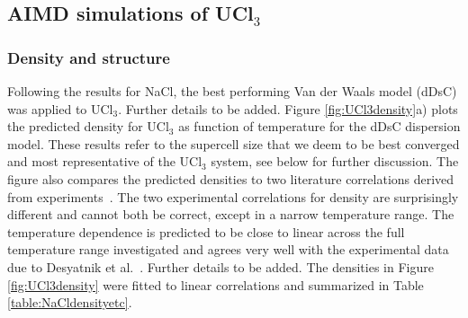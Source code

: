 \documentclass[preprint,3p,10pt,onecolumn,number,sort&compress]{elsarticle}
\begin{document}
\subsection{AIMD simulations of UCl$_3$}
\subsubsection{Density and structure}
Following the results for NaCl, the best performing Van der Waals model (dDsC) was applied to UCl$_3$. {\color{red} Further details to be added.}%
Figure \ref{fig:UCl3density}a) plots the predicted density for UCl$_3$ as function of temperature for the dDsC dispersion model. 
These results refer to the supercell size that we deem to be best converged and most representative of the UCl$_3$ system, see below for further discussion. 
The figure also compares the predicted densities to two literature correlations derived from experiments~\cite{Janz1988,Desyatnik}.
The two experimental correlations for density are surprisingly different and cannot both be correct, except in a narrow temperature range. 
 The temperature dependence is predicted to be close to linear across the full temperature range investigated and agrees very well with the experimental data due to Desyatnik et al.~\cite{Desyatnik}.  {\color{red}Further details to be added.} %
 The densities in Figure \ref{fig:UCl3density} were fitted to linear correlations and summarized in Table \ref{table:NaCldensityetc}. 
 
\end{document}
